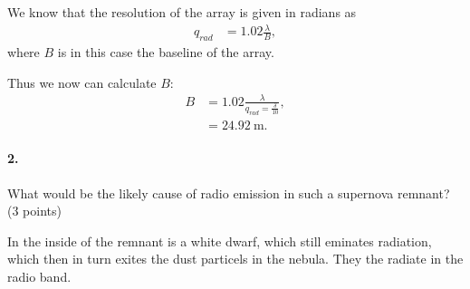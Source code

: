 \documentclass[11pt,a4paper,twoside]{article}
\begin{document}
We know that the resolution of the array is given in radians as
\begin{align}
q_{rad} &= 1.02\frac{\lambda}{B},
\end{align}
where $B$ is in this case the baseline of the array.

Thus we now can calculate $B$:
\begin{align}
B  &= 1.02 \frac{\lambda}{q_{rad} = \frac{\delta}{10}}, \\
    &= \SI{24.92}{\meter}.
\end{align}


\paragraph{2.} What would be the likely cause of radio emission in such a
supernova remnant? (3 points)

In the inside of the remnant is a white dwarf, which still eminates radiation,
which then in turn exites the dust particels in the nebula. They the radiate
in the radio band.
\end{document}
